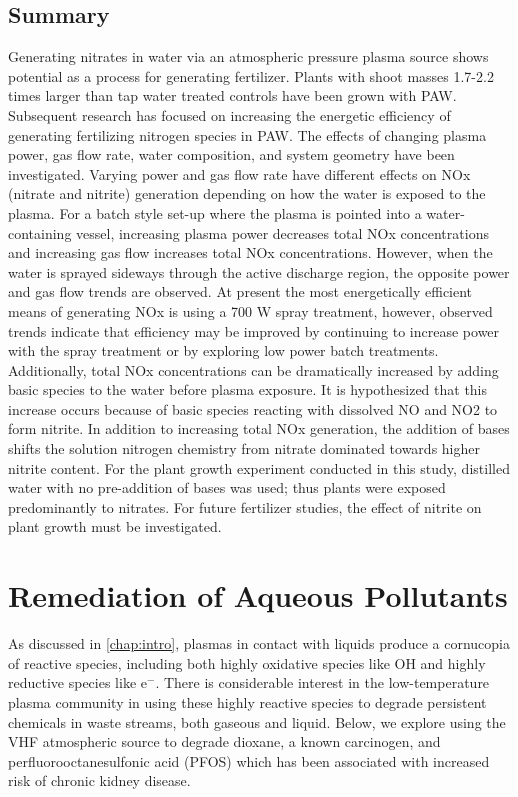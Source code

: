 \subsection{Summary}

Generating nitrates in water via an atmospheric pressure plasma source shows potential as a process for generating fertilizer.  Plants with shoot masses 1.7-2.2 times larger than tap water treated controls have been grown with PAW.  Subsequent research has focused on increasing the energetic efficiency of generating fertilizing nitrogen species in PAW.  The effects of changing plasma power, gas flow rate, water composition, and system geometry have been investigated.  Varying power and gas flow rate have different effects on NOx (nitrate and nitrite) generation depending on how the water is exposed to the plasma.  For a batch style set-up where the plasma is pointed into a water-containing vessel, increasing plasma power decreases total NOx concentrations and increasing gas flow increases total NOx concentrations.  However, when the water is sprayed sideways through the active discharge region, the opposite power and gas flow trends are observed.  At present the most energetically efficient means of generating NOx is using a 700 W spray treatment, however, observed trends indicate that efficiency may be improved by continuing to increase power with the spray treatment or by exploring low power batch treatments.   Additionally, total NOx concentrations can be dramatically increased by adding basic species to the water before plasma exposure.  It is hypothesized that this increase occurs because of basic species reacting with dissolved NO and NO2 to form nitrite.  In addition to increasing total NOx generation, the addition of bases shifts the solution nitrogen chemistry from nitrate dominated towards higher nitrite content.  For the plant growth experiment conducted in this study, distilled water with no pre-addition of bases was used; thus plants were exposed predominantly to nitrates.  For future fertilizer studies, the effect of nitrite on plant growth must be investigated.

\section{Remediation of Aqueous Pollutants}

As discussed in \cref{chap:intro}, plasmas in contact with liquids produce a cornucopia of reactive species, including both highly oxidative species like OH and highly reductive species like e$^-$. There is considerable interest in the low-temperature plasma community in using these highly reactive species to degrade persistent chemicals in waste streams, both gaseous and liquid. Below, we explore using the VHF atmospheric source to degrade dioxane, a known carcinogen, and perfluorooctanesulfonic acid (PFOS) which has been associated with increased risk of chronic kidney disease. \cite{shankar2011perfluoroalkyl}

